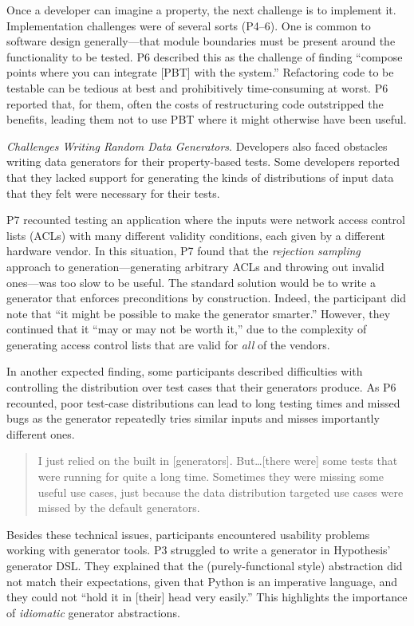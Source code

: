 Once a developer can imagine a property, the next challenge is to implement it.
Implementation challenges were of several sorts (P4--6). One
is common to software design generally---that module boundaries must be present
around the functionality to be tested. P6 described this as the challenge of
finding ``compose points where you can integrate [PBT] with the system.'' Refactoring
code to be testable can be tedious at best and prohibitively time-consuming at
worst. P6 reported that, for them, often the costs of restructuring code outstripped the benefits,
leading them not to use PBT where it might otherwise have been useful.

\textit{Challenges Writing Random Data Generators}.
Developers also faced obstacles writing data generators for their property-based
tests.
Some developers reported that they lacked support for generating the kinds of
distributions of input data that they felt were necessary for their tests.

P7 recounted testing an application where the inputs were network access control lists (ACLs)
with many different validity conditions, each given by
a different hardware vendor.
In this situation, P7 found that the {\em rejection sampling} approach to generation---generating
arbitrary ACLs and throwing out invalid ones---was too slow to be useful.
The standard solution would be to write a generator that enforces preconditions
by construction. Indeed, the participant did note that ``it might be possible to
make the generator smarter.'' However, they continued that it ``may or may not be worth it,'' due to
the complexity of generating access control lists that are valid for \emph{all}
of the vendors.

In another expected finding, some participants described difficulties with
controlling the distribution over test cases that their generators produce.
As P6 recounted, poor test-case distributions can lead to long testing times and missed bugs
as the generator repeatedly tries similar inputs and misses importantly different ones.
\begin{quote}
  I just relied on the built in [generators]. But\dots [there were] some tests
  that were running for quite a long time. Sometimes they were missing some
  useful use cases, just because the data distribution targeted use cases were
  missed by the default generators.
\end{quote}

Besides these technical issues,
participants encountered usability problems working with generator tools. P3 struggled to
write a generator in Hypothesis' generator DSL. They
explained that the (purely-functional style) abstraction did not match their expectations, given that Python is an imperative language, and they could
not ``hold it in [their] head very easily.'' This highlights the importance of
{\em idiomatic} generator abstractions.

